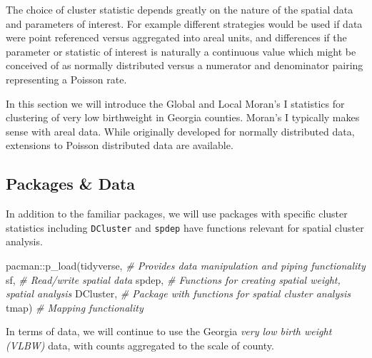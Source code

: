 \documentclass[
]{book}
\newenvironment{Shaded}{\begin{snugshade}}{\end{snugshade}}
\newcommand{\AttributeTok}[1]{\textcolor[rgb]{0.77,0.63,0.00}{#1}}
\newcommand{\CommentTok}[1]{\textcolor[rgb]{0.56,0.35,0.01}{\textit{#1}}}
\newcommand{\FunctionTok}[1]{\textcolor[rgb]{0.00,0.00,0.00}{#1}}
\newcommand{\NormalTok}[1]{#1}
\newcommand{\OtherTok}[1]{\textcolor[rgb]{0.56,0.35,0.01}{#1}}
\newcommand{\SpecialCharTok}[1]{\textcolor[rgb]{0.00,0.00,0.00}{#1}}
\newcommand{\StringTok}[1]{\textcolor[rgb]{0.31,0.60,0.02}{#1}}
\begin{document}
The choice of cluster statistic depends greatly on the nature of the spatial data and parameters of interest. For example different strategies would be used if data were point referenced versus aggregated into areal units, and differences if the parameter or statistic of interest is naturally a continuous value which might be conceived of as normally distributed versus a numerator and denominator pairing representing a Poisson rate.

In this section we will introduce the Global and Local Moran's I statistics for clustering of very low birthweight in Georgia counties. Moran's I typically makes sense with areal data. While originally developed for normally distributed data, extensions to Poisson distributed data are available.

\hypertarget{packages-data-1}{%
\subsection{Packages \& Data}\label{packages-data-1}}

In addition to the familiar packages, we will use packages with specific cluster statistics including \texttt{DCluster} and \texttt{spdep} have functions relevant for spatial cluster analysis.

\begin{Shaded}
\begin{Highlighting}[]
\NormalTok{pacman}\SpecialCharTok{::}\FunctionTok{p\_load}\NormalTok{(tidyverse, }\CommentTok{\# Provides data manipulation and piping functionality}
\NormalTok{               sf,        }\CommentTok{\# Read/write spatial data}
\NormalTok{               spdep,     }\CommentTok{\# Functions for creating spatial weight, spatial analysis}
\NormalTok{               DCluster,  }\CommentTok{\# Package with functions for spatial cluster analysis}
\NormalTok{               tmap)      }\CommentTok{\# Mapping functionality}
\end{Highlighting}
\end{Shaded}

In terms of data, we will continue to use the Georgia \emph{very low birth weight (VLBW)} data, with counts aggregated to the scale of county.

\begin{Shaded}
\end{Shaded}
\end{document}
